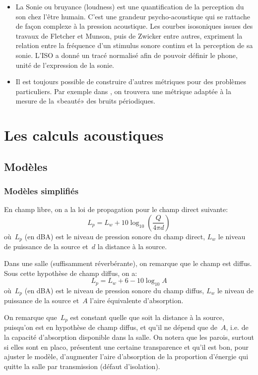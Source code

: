 \begin{itemize}
   \item La Sonie ou bruyance (loudness) est une quantification de la perception du son chez l'être humain. C'est une grandeur psycho-acoustique qui se rattache de façon complexe à la pression acoustique. Les courbes isosoniques issues des travaux de Fletcher et Munson, puis de Zwicker entre autres, expriment la relation entre la fréquence d'un stimulus sonore continu et la perception de sa sonie. L'ISO a donné un tracé normalisé afin de pouvoir définir le phone, unité de l'expression de la sonie.

   \item Il est toujours possible de construire d'autres métriques pour des problèmes particuliers. Par exemple dans \cite{bib-VM-suav}, on trouvera une métrique adaptée à la mesure de la «beauté» des bruits périodiques.
\end{itemize}

\medskip
\section{Les calculs acoustiques}\label{Sec-AcouMEF}

\medskip
\subsection{Modèles}

\medskip
\subsubsection{Modèles simplifiés}

En champ libre, on a la loi de propagation pour le champ direct suivante:
\begin{equation}
L_p=L_w+10\log_{10}\left(\dfrac{Q}{4\pi d}\right)
\end{equation}
où~$L_p$ (en dBA) est le niveau de pression sonore du champ direct, $L_w$ le niveau de puissance de la source et~$d$ la distance à la source.

\medskip
Dans une salle (suffisamment réverbérante), on remarque que le champ est diffus. Sous cette hypothèse de champ diffus, on a:
\begin{equation}
L_p = L_w + 6 - 10\log_{10} A
\end{equation}
où~$L_p$ (en dBA) est le niveau de pression sonore du champ diffus, $L_w$ le niveau de puissance de la source et~$A$ l'aire équivalente d'absorption.

On remarque que~$L_p$ est constant quelle que soit la distance à la source, puisqu'on est en hypothèse de champ diffus, et qu'il ne dépend que de~$A$, i.e. de la capacité d'absorption disponible dans la salle.
On notera que les parois, surtout si elles sont en placo, présentent une certaine transparence et qu'il est bon, pour ajuster le modèle, d'augmenter l'aire d'absorption de la proportion d'énergie qui quitte la salle par transmission (défaut d'isolation).

